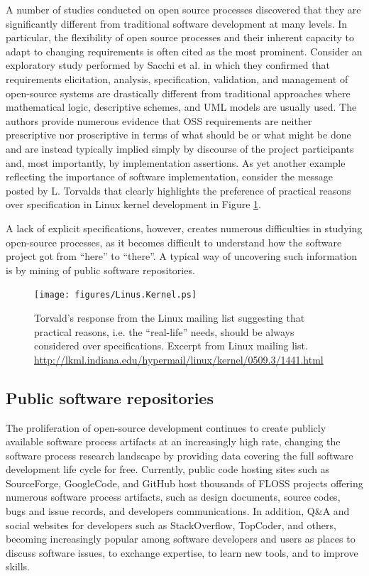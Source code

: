 A number of studies conducted on open source processes discovered that they are significantly 
different from traditional software development at many levels. In particular, the flexibility 
of open source processes and their inherent capacity to adapt to changing requirements is often 
cited as the most prominent. 
Consider an exploratory study performed by Sacchi et al. \cite{citeulike:342840} in which they 
confirmed that requirements elicitation, analysis, specification, validation, and management of 
open-source systems are drastically different from traditional approaches where mathematical 
logic, descriptive schemes, and UML models are usually used. 
The authors provide numerous evidence that OSS requirements are neither prescriptive nor 
proscriptive in terms of what should be or what might be done and are instead typically implied simply 
by discourse of the project participants and, most importantly, by implementation assertions.
As yet another example reflecting the importance of software implementation, consider the message 
posted by L. Torvalds that clearly highlights the preference of practical reasons over specification 
in Linux kernel development in Figure \ref{fig:kernel}.

A lack of explicit specifications, however, creates numerous difficulties in studying open-source processes, 
as it becomes difficult to understand how the software project got from ``here'' to ``there''. 
A typical way of uncovering such information is by mining of public software repositories.

\begin{figure}[ht!]
   \centering
   \texttt{[image: figures/Linus.Kernel.ps]}
   \caption[Torvald's response from the Linux mailing list suggesting that practical reasons, 
   i.e. the ``real-life'' needs, should be always considered over specifications.]{Torvald's response from the Linux mailing list suggesting that practical reasons, 
   i.e. the ``real-life'' needs, should be always considered over specifications.
   Excerpt from Linux mailing list. \url{http://lkml.indiana.edu/hypermail/linux/kernel/0509.3/1441.html}}
   \label{fig:kernel}
\end{figure}

\subsection{Public software repositories}
The proliferation of open-source development continues to create publicly available software process 
artifacts at an increasingly high rate, changing the software process research landscape by providing 
data covering the full software development life cycle for free. 
Currently, public code hosting sites such as SourceForge, GoogleCode, and GitHub host thousands of FLOSS 
projects offering numerous software process artifacts, such as design documents, source codes, bugs and 
issue records, and developers communications.
In addition, Q\&A and social websites for developers such as StackOverflow, TopCoder, and others, becoming 
increasingly popular among software developers and users as places to discuss software issues, 
to exchange expertise, to learn new tools, and to improve skills.

